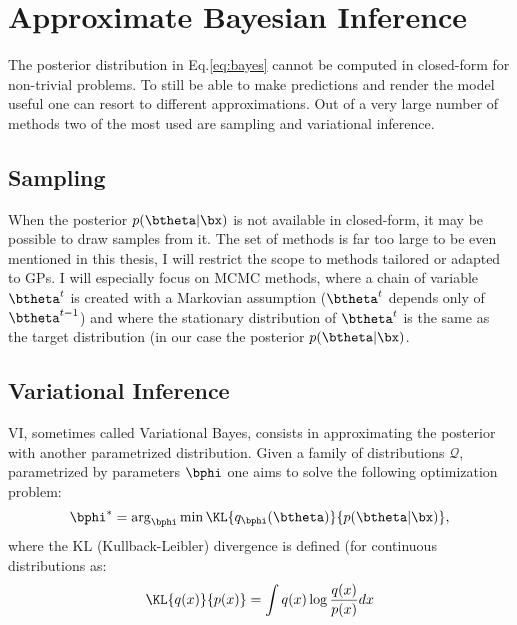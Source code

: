 \section{Approximate Bayesian Inference}
\label{sec:approx_inf}
The posterior distribution in Eq.\eqref{eq:bayes} cannot be computed in closed-form for non-trivial problems.
To still be able to make predictions and render the model useful one can resort to different approximations.
Out of a very large number of methods two of the most used are sampling and variational inference.

\subsection{Sampling}

When the posterior $p(\btheta|\bx)$ is not available in closed-form, it may be possible to draw samples from it.
The set of methods is far too large to be even mentioned in this thesis, I will restrict the scope to methods tailored or adapted to \ac{GPs}.
I will especially focus on \ac{MCMC} methods, where a chain of variable $\btheta^t$ is created with a Markovian assumption ($\btheta^t$ depends only of $\btheta^{t-1}$) and where the stationary distribution of $\btheta^t$ is the same as the target distribution (in our case the posterior $p(\btheta|\bx)$.



\subsection{Variational Inference}

\acf{VI}, sometimes called Variational Bayes, consists in approximating the posterior with another parametrized distribution.
Given a family of distributions $\mathcal{Q}$, parametrized by parameters $\bphi$ one aims to solve the following optimization problem:
\begin{align}
\bphi^* = \arg_{\bphi}\min \KL{q_{\bphi}(\btheta)}{p(\btheta|\bx)},
\label{eq:prob_VI}
\end{align}
where the $\mathrm{KL}$ (Kullback-Leibler) divergence is defined (for continuous distributions as:
\begin{align}
\KL{q(x)}{p(x)} = \int q(x) \log \frac{q(x)}{p(x)}dx
\end{align}

